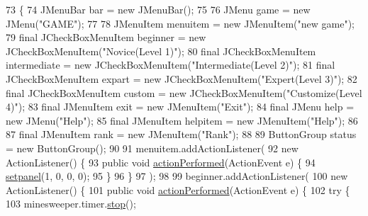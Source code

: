 \begin{DoxyCode}
73                           \{
74         JMenuBar bar = \textcolor{keyword}{new} JMenuBar();
75  
76         JMenu game = \textcolor{keyword}{new} JMenu(\textcolor{stringliteral}{"GAME"});
77  
78         JMenuItem menuitem = \textcolor{keyword}{new} JMenuItem(\textcolor{stringliteral}{"new game"});
79         \textcolor{keyword}{final} JCheckBoxMenuItem beginner = \textcolor{keyword}{new} JCheckBoxMenuItem(\textcolor{stringliteral}{"Novice(Level 1)"});
80         \textcolor{keyword}{final} JCheckBoxMenuItem intermediate = \textcolor{keyword}{new} JCheckBoxMenuItem(\textcolor{stringliteral}{"Intermediate(Level 2)"});
81         \textcolor{keyword}{final} JCheckBoxMenuItem expart = \textcolor{keyword}{new} JCheckBoxMenuItem(\textcolor{stringliteral}{"Expert(Level 3)"});
82         \textcolor{keyword}{final} JCheckBoxMenuItem custom = \textcolor{keyword}{new} JCheckBoxMenuItem(\textcolor{stringliteral}{"Customize(Level 4)"});
83         \textcolor{keyword}{final} JMenuItem exit = \textcolor{keyword}{new} JMenuItem(\textcolor{stringliteral}{"Exit"});
84         \textcolor{keyword}{final} JMenu help = \textcolor{keyword}{new} JMenu(\textcolor{stringliteral}{"Help"});
85         \textcolor{keyword}{final} JMenuItem helpitem = \textcolor{keyword}{new} JMenuItem(\textcolor{stringliteral}{"Help"});
86         
87         \textcolor{keyword}{final} JMenuItem rank = \textcolor{keyword}{new} JMenuItem(\textcolor{stringliteral}{"Rank"});
88  
89         ButtonGroup status = \textcolor{keyword}{new} ButtonGroup();
90  
91         menuitem.addActionListener(
92                 \textcolor{keyword}{new} ActionListener() \{
93                     \textcolor{keyword}{public} \textcolor{keywordtype}{void} \hyperlink{classhufs_1_1cse_1_1khk_1_1_minesweeper_u_i_a896a8e57a116a0b4b43fb88b575ab5b8}{actionPerformed}(ActionEvent e) \{
94                         \hyperlink{classhufs_1_1cse_1_1khk_1_1_minesweeper_u_i_a9a871b3969d0f0c00cf420902d09cc18}{setpanel}(1, 0, 0, 0);
95                     \}
96                 \}
97         );
98  
99         beginner.addActionListener(
100                 \textcolor{keyword}{new} ActionListener() \{
101                     \textcolor{keyword}{public} \textcolor{keywordtype}{void} \hyperlink{classhufs_1_1cse_1_1khk_1_1_minesweeper_u_i_a896a8e57a116a0b4b43fb88b575ab5b8}{actionPerformed}(ActionEvent e) \{
102                         \textcolor{keywordflow}{try} \{
103                             minesweeper.timer.\hyperlink{classhufs_1_1cse_1_1khk_1_1_timer_a5ab9e7bd1e1b1f74604887cd99b27972}{stop}();

\end{DoxyCode}
